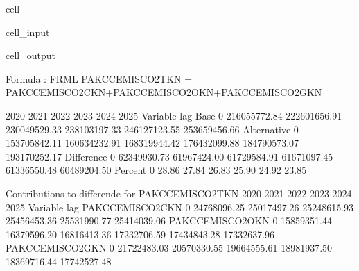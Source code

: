 \documentclass[letterpaper,10pt,english]{jupyterBook}
\begin{document}
\begin{sphinxuseclass}{cell}\begin{sphinxVerbatimInput}

\begin{sphinxuseclass}{cell_input}
\begin{sphinxVerbatim}[commandchars=\\\{\}]
 
    \PYG{p}{[}\PYG{p}{]}
\end{sphinxVerbatim}

\end{sphinxuseclass}\end{sphinxVerbatimInput}
\begin{sphinxVerbatimOutput}

\begin{sphinxuseclass}{cell_output}
\begin{sphinxVerbatim}[commandchars=\\\{\}]
Formula        : FRML  \PYGZlt{}\PYGZgt{} PAKCCEMISCO2TKN = PAKCCEMISCO2CKN+PAKCCEMISCO2OKN+PAKCCEMISCO2GKN \PYGZdl{} 

                        2020         2021         2022         2023         2024         2025
Variable    lag                                                                              
Base        0   216055772.84 222601656.91 230049529.33 238103197.33 246127123.55 253659456.66
Alternative 0   153705842.11 160634232.91 168319944.42 176432099.88 184790573.07 193170252.17
Difference  0   \PYGZhy{}62349930.73 \PYGZhy{}61967424.00 \PYGZhy{}61729584.91 \PYGZhy{}61671097.45 \PYGZhy{}61336550.48 \PYGZhy{}60489204.50
Percent     0         \PYGZhy{}28.86       \PYGZhy{}27.84       \PYGZhy{}26.83       \PYGZhy{}25.90       \PYGZhy{}24.92       \PYGZhy{}23.85

 Contributions to differende for  PAKCCEMISCO2TKN
                            2020         2021         2022         2023         2024         2025
Variable        lag                                                                              
PAKCCEMISCO2CKN 0   \PYGZhy{}24768096.25 \PYGZhy{}25017497.26 \PYGZhy{}25248615.93 \PYGZhy{}25456453.36 \PYGZhy{}25531990.77 \PYGZhy{}25414039.06
PAKCCEMISCO2OKN 0   \PYGZhy{}15859351.44 \PYGZhy{}16379596.20 \PYGZhy{}16816413.36 \PYGZhy{}17232706.59 \PYGZhy{}17434843.28 \PYGZhy{}17332637.96
PAKCCEMISCO2GKN 0   \PYGZhy{}21722483.03 \PYGZhy{}20570330.55 \PYGZhy{}19664555.61 \PYGZhy{}18981937.50 \PYGZhy{}18369716.44 \PYGZhy{}17742527.48


\end{sphinxVerbatim}
\end{sphinxuseclass}
\end{sphinxVerbatimOutput}
\end{sphinxuseclass}
\end{document}
